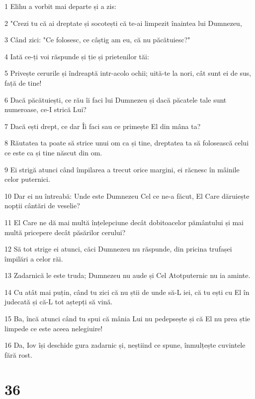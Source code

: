 \par 1 Elihu a vorbit mai departe și a zis:
\par 2 "Crezi tu că ai dreptate și socotești că te-ai limpezit înaintea lui Dumnezeu,
\par 3 Când zici: "Ce folosesc, ce câștig am eu, că nu păcătuiesc?"
\par 4 Iată ce-ți voi răspunde și ție și prietenilor tăi:
\par 5 Privește cerurile și îndreaptă intr-acolo ochii; uită-te la nori, cât sunt ei de sus, față de tine!
\par 6 Dacă păcătuiești, ce rău îi faci lui Dumnezeu și dacă păcatele tale sunt numeroase, ce-I strică Lui?
\par 7 Dacă ești drept, ce dar Îi faci sau ce primește El din mâna ta?
\par 8 Răutatea ta poate să strice unui om ca și tine, dreptatea ta să folosească celui ce este ca și tine născut din om.
\par 9 Ei strigă atunci când împilarea a trecut orice margini, ei răcnesc în mâinile celor puternici.
\par 10 Dar ei nu întreabă: Unde este Dumnezeu Cel ce ne-a făcut, El Care dăruiește nopții cântări de veselie?
\par 11 El Care ne dă mai multă înțelepciune decât dobitoacelor pământului și mai multă pricepere decât păsărilor cerului?
\par 12 Să tot strige ei atunci, căci Dumnezeu nu răspunde, din pricina trufașei împilări a celor răi.
\par 13 Zadarnică le este truda; Dumnezeu nu aude și Cel Atotputernic nu ia aminte.
\par 14 Cu atât mai puțin, când tu zici că nu știi de unde să-L iei, că tu ești cu El în judecată și că-L tot aștepți să vină.
\par 15 Ba, încă atunci când tu spui că mânia Lui nu pedepsește și că El nu prea știe limpede ce este aceea nelegiuire!
\par 16 Da, Iov își deschide gura zadarnic și, neștiind ce spune, înmulțește cuvintele fără rost.

\chapter{36}

